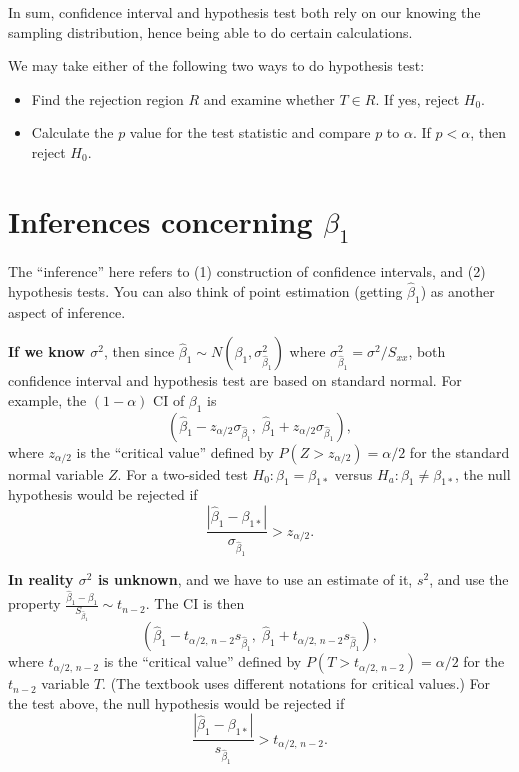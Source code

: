 \documentclass[12pt]{article}
\begin{document}
In sum,
confidence interval and hypothesis test both rely on our knowing the
sampling distribution, hence being able to do certain calculations.


We may take either of the following two ways to do hypothesis test:
\begin{itemize}
\item
Find the rejection region $R$ and examine whether $T \in R$.
If yes, reject $H_0$.
\item
Calculate the $p$ value for the test statistic and compare $p$ to
$\alpha$. If $p < \alpha$, then reject $H_0$.
\end{itemize}

\newpage

\section{Inferences concerning $\beta_1$}

The ``inference'' here refers to
(1) construction of confidence intervals,
and (2) hypothesis tests.
You can also think of point estimation
(\ie getting $\hat\beta_1$) as another aspect of inference.


\textbf{If we know $\sigma^2$},
then since $\hat{\beta}_1 \sim N(\beta_1, \sigma^2_{\hat{\beta}_1})$
where $\sigma^2_{\hat{\beta}_1} = \sigma^2/S_{xx}$,
both confidence
interval and hypothesis test are based on standard normal.
For example,
the $(1-\alpha)$ CI of $\beta_1$ is
\[
(\hat{\beta}_1 - z_{\alpha/2}\sigma_{\hat{\beta}_1},\;
\hat{\beta}_1 + z_{\alpha/2}\sigma_{\hat{\beta}_1})
,
\]
where $z_{\alpha/2}$ is the ``critical value'' defined by
$P(Z > z_{\alpha/2}) = \alpha/2$
for the standard normal variable $Z$.
For a two-sided test
$H_0: \beta_1 = \beta_{1*}$ versus
$H_a: \beta_1 \ne \beta_{1*}$,
the null hypothesis would be rejected if
\[
\frac{|\hat{\beta}_1 - \beta_{1*}|}{\sigma_{\hat{\beta}_1}} > z_{\alpha/2}
.
\]

\textbf{In reality $\sigma^2$ is unknown},
and we have to use an estimate of it, $s^2$,
and use the property
$\frac{\hat{\beta}_1 - \beta_1}{S_{\hat{\beta}_1}} \sim t_{n-2}$.
The CI is then
\[
(\hat{\beta}_1 - t_{\alpha/2,\, n-2}s_{\hat{\beta}_1},\;
\hat{\beta}_1 + t_{\alpha/2,\, n-2}s_{\hat{\beta}_1})
,
\]
where $t_{\alpha/2,\, n-2}$ is the ``critical value'' defined by
$P(T > t_{\alpha/2,\, n-2}) = \alpha/2$ for the $t_{n-2}$ variable $T$.
(The textbook uses different notations for critical values.)
For the test above,
the null hypothesis would be rejected if
\[
\frac{|\hat{\beta}_1 - \beta_{1*}|}{s_{\hat{\beta}_1}}
    > t_{\alpha/2,\, n-2}
.
\]
\end{document}
